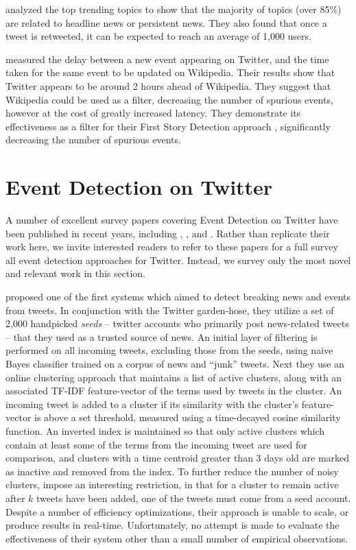 \cite{Kwak:2010:TSN:1772690.1772751} analyzed the top trending topics to show that the majority of topics (over 85\%) are related to headline news or persistent news. They also found that once a tweet is retweeted, it can be expected to reach an average of 1,000 users.

\cite{WRN2012:osbornebieber} measured the delay between a new event appearing on Twitter, and the time taken for the same event to be updated on Wikipedia. Their results show that Twitter appears to be around 2 hours ahead of Wikipedia. They suggest that Wikipedia could be used as a filter, decreasing the number of spurious events, however at the cost of greatly increased latency. They demonstrate its effectiveness as a filter for their First Story Detection approach \citep{Petrovic:2010:SFS:1857999.1858020}, significantly decreasing the number of spurious events.

\section{Event Detection on Twitter}
A number of excellent survey papers covering Event Detection on Twitter have been published in recent years, including \cite{Hasan17}, \cite{Goswami2016}, and \cite{Atefeh2015}. Rather than replicate their work here, we invite interested readers to refer to these papers for a full survey all event detection approaches for Twitter.
Instead, we survey only the most novel and relevant work in this section.

\cite{sankaranarayanan2009twitterstand} proposed one of the first systems which aimed to detect breaking news and events from tweets. In conjunction with the Twitter garden-hose, they utilize a set of 2,000 handpicked \emph{seeds} -- twitter accounts who primarily post news-related tweets -- that they used as a trusted source of news.
An initial layer of filtering is performed on all incoming tweets, excluding those from the seeds, using naive Bayes classifier trained on a corpus of news and ``junk'' tweets. Next they use an online clustering approach that maintains a list of active clusters, along with an associated TF-IDF \citep{Salton:1988:TAA:54259.54260} feature-vector of the terms used by tweets in the cluster. An incoming tweet is added to a cluster if its similarity with the cluster's feature-vector is above a set threshold, measured using a time-decayed cosine similarity function. An inverted index is maintained so that only active clusters which contain at least some of the terms from the incoming tweet are used for comparison, and clusters with a time centroid greater than 3 days old are marked as inactive and removed from the index.
To further reduce the number of noisy clusters, \cite{sankaranarayanan2009twitterstand} impose an interesting restriction, in that for a cluster to remain active after \(k\) tweets have been added, one of the tweets must come from a seed account.
Despite a number of efficiency optimizations, their approach is unable to scale, or produce results in real-time. Unfortunately, no attempt is made to evaluate the effectiveness of their system other than a small number of empirical observations.

